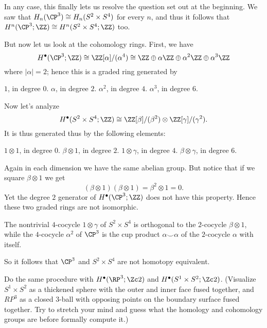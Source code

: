 In any case, this finally lets us resolve the question
set out at the beginning.
We saw that $H_n(\CP^3) \cong H_n(S^2 \times S^4)$ for every $n$,
and thus it follows that $H^n(\CP^3; \ZZ) \cong H^n(S^2 \times S^4; \ZZ)$ too.

But now let us look at the cohomology rings. First, we have
\[ H^\bullet(\CP^3; \ZZ) \cong \ZZ[\alpha] / (\alpha^4)
	\cong \ZZ \oplus \alpha\ZZ \oplus \alpha^2\ZZ \oplus \alpha^3\ZZ
\]
where $|\alpha| = 2$; hence this is a graded ring generated by
\begin{itemize}
	\ii $1$, in degree $0$.
	\ii $\alpha$, in degree $2$.
	\ii $\alpha^2$, in degree $4$.
	\ii $\alpha^3$, in degree $6$.
\end{itemize}

Now let's analyze
\[ H^\bullet(S^2 \times S^4; \ZZ) \cong
	\ZZ[\beta] / (\beta^2)
	\otimes
	\ZZ[\gamma] / (\gamma^2).
\]
It is thus generated thus by the following elements:
\begin{itemize}
	\ii $1 \otimes 1$, in degree $0$.
	\ii $\beta \otimes 1$, in degree $2$.
	\ii $1 \otimes \gamma$, in degree $4$.
	\ii $\beta \otimes \gamma$, in degree $6$.
\end{itemize}
Again in each dimension we have the same abelian group.
But notice that if we square $\beta \otimes 1$ we get
\[ (\beta \otimes 1)(\beta \otimes 1) = \beta^2 \otimes 1 = 0. \]
Yet the degree $2$ generator of $H^\bullet(\CP^3; \ZZ)$
does not have this property.
Hence these two graded rings are not isomorphic.

\begin{moral}
	The nontrivial $4$-cocycle $1 \otimes \gamma$ of $S^2 \times S^4$ is orthogonal to the
	$2$-cocycle $\beta \otimes 1$, while the $4$-cocycle $\alpha^2$ of $\CP^3$ is the cup product
	$\alpha \smile \alpha$ of the $2$-cocycle $\alpha$ with itself.
\end{moral}

So it follows that $\CP^3$ and $S^2 \times S^4$ are not homotopy equivalent.

\begin{exercise}
	Do the same procedure with $H^\bullet(\RP^3; \Zc 2)$ and $H^\bullet(S^1 \times S^2; \Zc 2)$.
	(Visualize $S^1 \times S^2$ as a thickened sphere with the outer and inner face fused together,
	and $RP^3$ as a closed $3$-ball with opposing points on the boundary surface fused together.
	Try to stretch your mind and guess what the homology and cohomology groups are before formally
	compute it.)
\end{exercise}

